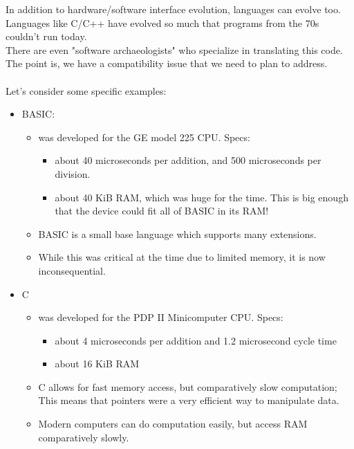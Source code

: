 \documentclass[../../lecture_notes.tex]{subfiles}
\begin{document}
\noindent In addition to hardware/software interface evolution, languages can evolve too.\\
Languages like C/C++ have evolved so much that programs from the 70s couldn't run today.\\
There are even "software archaeologists" who specialize in translating this code.\\
The point is, we have a compatibility issue that we need to plan to address.\\
\\
Let's consider some specific examples:
	\begin{itemize} [itemsep=0mm]
		\item BASIC:
			\begin{itemize} [itemsep=0mm]
				\item was developed for the GE model 225 CPU.  Specs:
					\begin{itemize} [itemsep=0mm]
						\item about 40 microseconds per addition, and 500 microseconds per division.
						\item about 40 KiB RAM, which was huge for the time.
							This is big enough that the device could fit all of BASIC in its RAM!
					\end{itemize}
				\item BASIC is a small base language which supports many extensions.
				\item While this was critical at the time due to limited memory, it is now inconsequential.
			\end{itemize}
		\item C
			\begin{itemize} [itemsep=0mm]
				\item was developed for the PDP II Minicomputer CPU.  Specs:
					\begin{itemize} [itemsep=0mm]
						\item about 4 microseconds per addition and 1.2 microsecond cycle time
						\item about 16 KiB RAM
					\end{itemize}
				\item C allows for fast memory access, but comparatively slow computation;\\
					This means that pointers were a very efficient way to manipulate data.
				\item Modern computers can do computation easily, but access RAM comparatively slowly.
			\end{itemize}
	\end{itemize}
\end{document}
